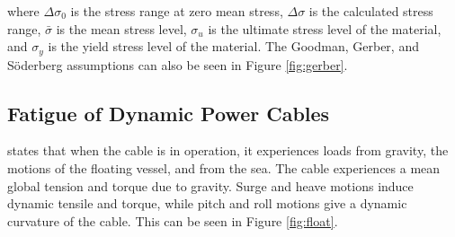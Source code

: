 \noindent where $\Delta \sigma_0$ is the stress range at zero mean stress, $\Delta \sigma$ is the calculated stress range, $\bar{\sigma}$ is the mean stress level, $\sigma_u$ is the ultimate stress level of the material, and $\sigma_y$ is the yield stress level of the material. The Goodman, Gerber, and Söderberg assumptions can also be seen in Figure \ref{fig:gerber}. 

\subsection{Fatigue of Dynamic Power Cables}
\noindent \cite{Nasution2013} states that when the cable is in operation, it experiences loads from gravity, the motions of the floating vessel, and from the sea. The cable experiences a mean global tension and torque due to gravity. Surge and heave motions induce dynamic tensile and torque, while pitch and roll motions give a dynamic curvature of the cable. This can be seen in Figure \ref{fig:float}. 

